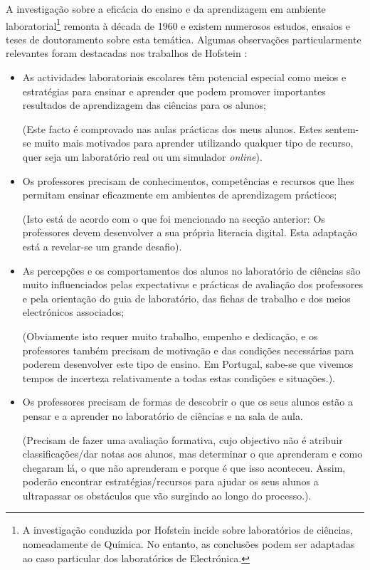 A investigação sobre a eficácia do ensino e da aprendizagem em ambiente laboratorial\footnote{\label{Hofstein}A investigação conduzida por Hofstein \cite{Hofstein} incide sobre laboratórios de ciências, nomeadamente de Química. No entanto, as conclusões podem ser adaptadas ao caso particular dos laboratórios de Electrónica.} remonta à década de 1960 e existem numerosos estudos, ensaios e teses de doutoramento sobre esta temática. Algumas observações particularmente relevantes foram destacadas nos trabalhos de Hofstein \cite{Hofstein}:
\begin{itemize}
    \item As actividades laboratoriais escolares têm potencial especial como meios e estratégias para ensinar e aprender que podem promover importantes resultados de aprendizagem das ciências para os alunos;

          (Este facto é comprovado nas aulas prácticas dos meus alunos. Estes sentem-se muito mais motivados para aprender utilizando qualquer tipo de recurso, quer seja um laboratório real ou um simulador \textit{online}).
    \item Os professores precisam de conhecimentos, competências e recursos que lhes permitam ensinar eficazmente em ambientes de aprendizagem prácticos;

          (Isto está de acordo com o que foi mencionado na secção anterior: Os professores devem desenvolver a sua própria literacia digital. Esta adaptação está a revelar-se um grande desafio).
    \item As percepções e os comportamentos dos alunos no laboratório de ciências são muito influenciados pelas expectativas e prácticas de avaliação dos professores e pela orientação do guia de laboratório, das fichas de trabalho e dos meios electrónicos associados;

          (Obviamente isto requer muito trabalho, empenho e dedicação, e os professores também precisam de motivação e das condições necessárias para poderem desenvolver este tipo de ensino. Em Portugal, sabe-se que vivemos tempos de incerteza relativamente a todas estas condições e situações.).

    \item Os professores precisam de formas de descobrir o que os seus alunos estão a pensar e a aprender no laboratório de ciências e na sala de aula.

          (Precisam de fazer uma avaliação formativa, cujo objectivo não é atribuir classificações/dar notas aos alunos, mas determinar o que aprenderam e como chegaram lá, o que não aprenderam e porque é que isso aconteceu. Assim, poderão encontrar estratégias/recursos para ajudar os seus alunos a ultrapassar os obstáculos que vão surgindo ao longo do processo.).
\end{itemize}
